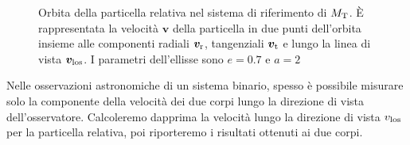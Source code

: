 {\begin{figure}[tb]
  \caption[Velocità nella direzione della linea di vista]{Orbita della
    particella relativa nel sistema di riferimento di $M_\textup{T}$. È
    rappresentata la velocità $\bm{v}$ della particella in due punti dell'orbita
    insieme alle componenti radiali $\bm{v}_{\textup{r}}$, tangenziali
    $\bm{v}_{\textup{t}}$ e lungo la linea di vista $\bm{v}_\textup{los}$. I
    parametri dell'ellisse sono $e=0.7$ e $a=2$}
  \label{fig:ellisse-vlos}
\end{figure}
Nelle osservazioni astronomiche di un sistema binario, spesso è possibile
misurare solo la componente della velocità dei due corpi lungo la direzione di
vista dell'osservatore. Calcoleremo dapprima la velocità lungo la direzione di
vista $v_\textup{los}$ per la particella relativa, poi riporteremo i risultati
ottenuti ai due corpi.

}
